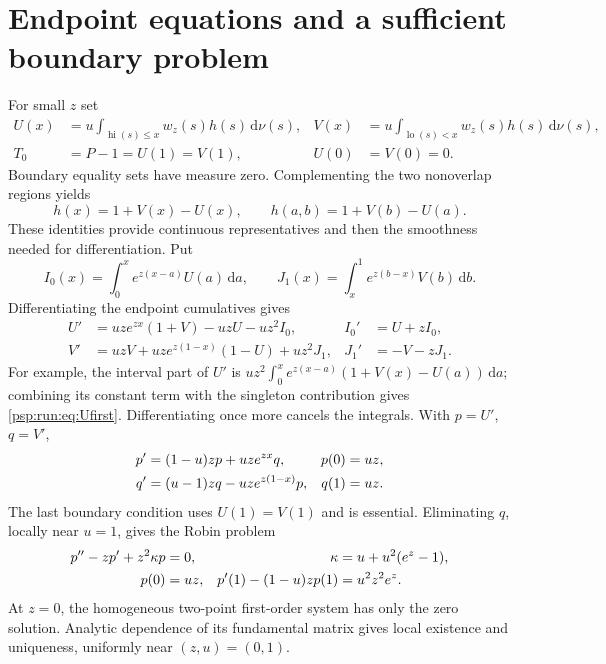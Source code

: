\documentclass[11pt,letterpaper]{article}
\numberwithin{equation}{section}
\theoremstyle{remark}\newtheorem{remark}[theorem]{Remark}
\newcommand{\dd}{\,\mathrm d}
\newcommand{\lo}{\operatorname{lo}}
\newcommand{\hi}{\operatorname{hi}}
\begin{document}
\section{Endpoint equations and a sufficient boundary problem}\label{psp:run:sec:bvp}
For small $z$ set
\begin{align*}
 U(x)&=u\int_{\hi(s)\leq x}w_z(s)h(s)\dd\nu(s),&
 V(x)&=u\int_{\lo(s)<x}w_z(s)h(s)\dd\nu(s),\\
 T_0&=P-1=U(1)=V(1),& U(0)&=V(0)=0.
\end{align*}
Boundary equality sets have measure zero. Complementing the two
nonoverlap regions yields
\begin{equation}\label{psp:run:eq:hUV}
 h(x)=1+V(x)-U(x),\qquad h(a,b)=1+V(b)-U(a).
\end{equation}
These identities provide continuous representatives and then the
smoothness needed for differentiation. Put
\[
 I_0(x)=\int_0^xe^{z(x-a)}U(a)\dd a,\qquad
 J_1(x)=\int_x^1e^{z(b-x)}V(b)\dd b.
\]
Differentiating the endpoint cumulatives gives
\begin{align}
 U'&=uze^{zx}(1+V)-uzU-uz^2I_0,& I_0'&=U+zI_0,\label{psp:run:eq:Ufirst}\\
 V'&=uzV+uze^{z(1-x)}(1-U)+uz^2J_1,& J_1'&=-V-zJ_1.
 \label{psp:run:eq:Vfirst}
\end{align}
For example, the interval part of $U'$ is
$uz^2\int_0^xe^{z(x-a)}(1+V(x)-U(a))\dd a$; combining its constant term
with the singleton contribution gives \eqref{psp:run:eq:Ufirst}. Differentiating
once more cancels the integrals. With $p=U'$, $q=V'$,
\begin{align}
 p'&=(1-u)zp+uze^{zx}q,& p(0)&=uz,\notag\\
 q'&=(u-1)zq-uze^{z(1-x)}p,& q(1)&=uz.\label{psp:run:eq:system}
\end{align}
The last boundary condition uses $U(1)=V(1)$ and is essential.
Eliminating $q$, locally near $u=1$, gives the Robin problem
\begin{align}
 p''-zp'+z^2\kappa p&=0,& \kappa&=u+u^2(e^z-1),\notag\\
 p(0)&=uz,&p'(1)-(1-u)zp(1)&=u^2z^2e^z.\label{psp:run:eq:Robin}
\end{align}
At $z=0$, the homogeneous two-point first-order system has only the
zero solution. Analytic dependence of its fundamental matrix gives
local existence and uniqueness, uniformly near $(z,u)=(0,1)$.
\end{document}
